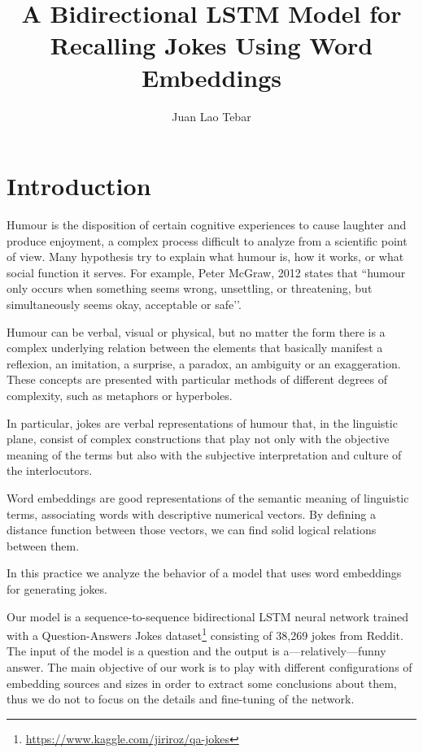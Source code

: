 \documentclass[]{article}
\title{A Bidirectional LSTM Model for Recalling Jokes Using Word Embeddings}
\author{Juan Lao Tebar}
\begin{document}
	\maketitle
	
	\section{Introduction}
	
	Humour is the disposition of certain cognitive experiences to cause laughter and produce enjoyment, a complex process difficult to analyze from a scientific point of view. Many hypothesis try to explain what humour is, how it works, or what social function it serves. For example, Peter McGraw, 2012 states that ``humour only occurs when something seems wrong, unsettling, or threatening, but simultaneously seems okay, acceptable or safe’’.
	
	Humour can be verbal, visual or physical, but no matter the form there is a complex underlying relation between the elements that basically manifest a reflexion, an imitation, a surprise, a paradox, an ambiguity or an exaggeration. These concepts are presented with particular methods of different degrees of complexity, such as metaphors or hyperboles.
	
	In particular, jokes are verbal representations of humour that, in the linguistic plane, consist of complex constructions that play not only with the objective meaning of the terms but also with the subjective interpretation and culture of the interlocutors.
	
	Word embeddings are good representations of the semantic meaning of linguistic terms, associating words with descriptive numerical vectors. By defining a distance function between those vectors, we can find solid logical relations between them.
	
	In this practice we analyze the behavior of a model that uses word embeddings for generating jokes.
	
	Our model is a sequence-to-sequence bidirectional LSTM neural network trained with a Question-Answers Jokes dataset\footnote{\url{https://www.kaggle.com/jiriroz/qa-jokes}} consisting of 38,269 jokes from Reddit. The input of the model is a question and the output is a---relatively---funny answer. The main objective of our work is to play with different configurations of embedding sources and sizes in order to extract some conclusions about them, thus we do not to focus on the details and fine-tuning of the network.
	
\end{document}
